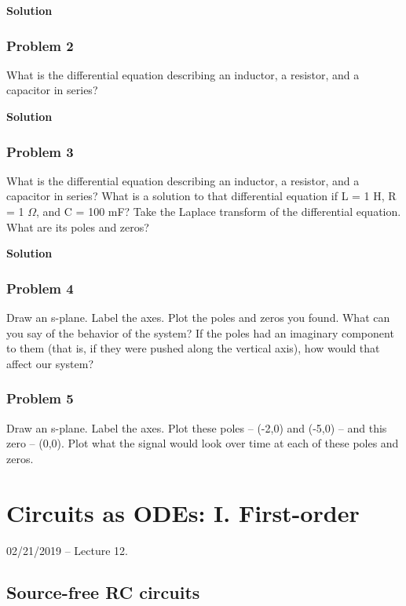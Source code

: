\documentclass[11pt]{book}
\begin{document}
\textbf{Solution}


\subsection{Problem 2}
What is the differential equation describing an inductor, a resistor, and a capacitor in series?

\textbf{Solution}


\subsection{Problem 3}
What is the differential equation describing an inductor, a resistor, and a capacitor in series? What is a solution to that  differential equation if L = 1 H, R = 1 $\Omega$, and C = 100 mF? Take the Laplace transform of the differential equation. What are its poles and zeros?

\textbf{Solution}

\newpage

\subsection{Problem 4}
Draw an s-plane. Label the axes. Plot the poles and zeros you found. What can you say of the behavior of the system? If the poles had an imaginary component to them (that is, if they were pushed along the vertical axis), how would that affect our system?

\subsection{Problem 5}
Draw an s-plane. Label the axes. Plot these poles -- (-2,0) and (-5,0) -- and this zero -- (0,0). Plot what the signal would look over time at each of these poles and zeros. 


\chapter{Circuits as ODEs: I. First-order}
02/21/2019 – Lecture 12. 
\section{Source-free RC circuits}
\end{document}
